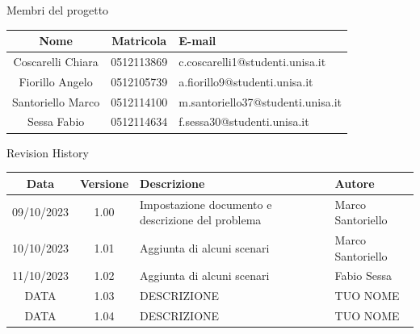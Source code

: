 \documentclass[12pt, a4paper, oneside]{book}
\begin{document}
    \newpage
    \begin{center}
    {\LARGE{Membri del progetto}}
    \end{center}
    \begin{center}
        \begin{tabular}{|c|c|m{8cm}|}
            \hline
            \cellcolor{lightgray} \textbf{Nome} & \cellcolor{lightgray} \textbf{Matricola} & \cellcolor{lightgray} \textbf{E-mail}\\ \hline
            Coscarelli  Chiara & 0512113869 & c.coscarelli1@studenti.unisa.it\\ \hline
            Fiorillo Angelo & 0512105739 & a.fiorillo9@studenti.unisa.it\\ \hline
            Santoriello Marco &  0512114100 & m.santoriello37@studenti.unisa.it\\ \hline
            Sessa Fabio & 0512114634 & f.sessa30@studenti.unisa.it\\ \hline
        \end{tabular}
    \end{center}

    \begin{center}
    {\LARGE{Revision History}}
    \end{center}

    \begin{center}
        \begin{tabular}{|c|c|m{8cm}|m{3.5cm}|}
            \hline
            \cellcolor{lightgray} \textbf{Data} & \cellcolor{lightgray} \textbf{Versione} & \cellcolor{lightgray} \textbf{Descrizione} & \cellcolor{lightgray} \textbf{Autore}\\ \hline
            09/10/2023 & 1.00 & Impostazione documento e descrizione del problema & Marco Santoriello\\ \hline
            10/10/2023 & 1.01 & Aggiunta di alcuni scenari & Marco Santoriello\\ \hline
            11/10/2023 & 1.02 & Aggiunta di alcuni scenari & Fabio Sessa\\ \hline
            DATA & 1.03 & DESCRIZIONE & TUO NOME\\ \hline
            DATA & 1.04 & DESCRIZIONE & TUO NOME\\ \hline
        \end{tabular}
    \end{center}
\end{document}
